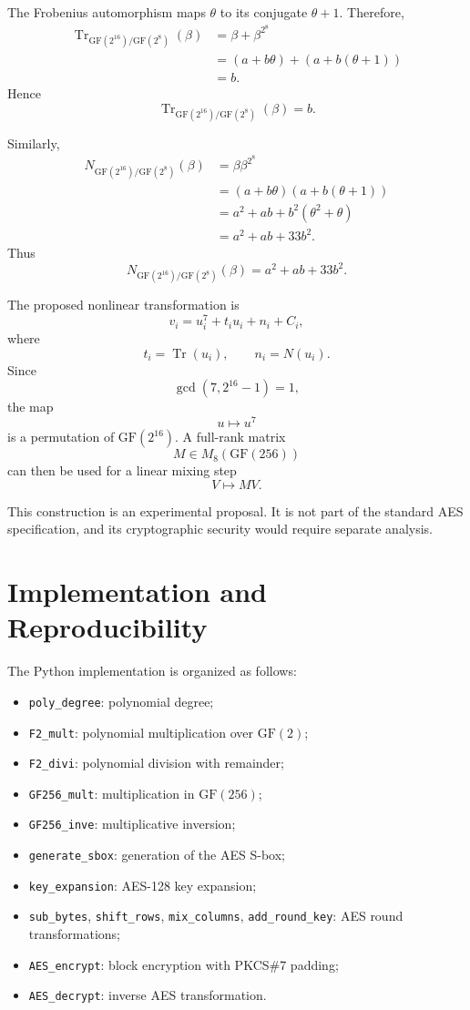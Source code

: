 \documentclass[11pt,a4paper]{article}
\begin{document}
The Frobenius automorphism maps $\theta$ to its conjugate $\theta+1$.
Therefore,
\[
\begin{aligned}
\operatorname{Tr}_{\mathrm{GF}(2^{16})/\mathrm{GF}(2^8)}(\beta)
&=\beta+\beta^{2^8}\\
&=(a+b\theta)+(a+b(\theta+1))\\
&=b.
\end{aligned}
\]
Hence
\[
\boxed{
\operatorname{Tr}_{\mathrm{GF}(2^{16})/\mathrm{GF}(2^8)}(\beta)=b.
}
\]

Similarly,
\[
\begin{aligned}
N_{\mathrm{GF}(2^{16})/\mathrm{GF}(2^8)}(\beta)
&=\beta\beta^{2^8}\\
&=(a+b\theta)(a+b(\theta+1))\\
&=a^2+ab+b^2(\theta^2+\theta)\\
&=a^2+ab+33b^2.
\end{aligned}
\]
Thus
\[
\boxed{
N_{\mathrm{GF}(2^{16})/\mathrm{GF}(2^8)}(\beta)
=a^2+ab+33b^2.
}
\]

The proposed nonlinear transformation is
\[
v_i=u_i^7+t_i u_i+n_i+C_i,
\]
where
\[
t_i=\operatorname{Tr}(u_i),\qquad
n_i=N(u_i).
\]
Since
\[
\gcd(7,2^{16}-1)=1,
\]
the map
\[
u\mapsto u^7
\]
is a permutation of $\mathrm{GF}(2^{16})$. A full-rank matrix
\[
M\in M_8(\mathrm{GF}(256))
\]
can then be used for a linear mixing step
\[
V\mapsto MV.
\]

This construction is an experimental proposal. It is not part of the
standard AES specification, and its cryptographic security would require
separate analysis.

\section{Implementation and Reproducibility}

The Python implementation is organized as follows:
\begin{itemize}
    \item \texttt{poly\_degree}: polynomial degree;
    \item \texttt{F2\_mult}: polynomial multiplication over $\mathrm{GF}(2)$;
    \item \texttt{F2\_divi}: polynomial division with remainder;
    \item \texttt{GF256\_mult}: multiplication in $\mathrm{GF}(256)$;
    \item \texttt{GF256\_inve}: multiplicative inversion;
    \item \texttt{generate\_sbox}: generation of the AES S-box;
    \item \texttt{key\_expansion}: AES-128 key expansion;
    \item \texttt{sub\_bytes}, \texttt{shift\_rows}, \texttt{mix\_columns},
          \texttt{add\_round\_key}: AES round transformations;
    \item \texttt{AES\_encrypt}: block encryption with PKCS\#7 padding;
    \item \texttt{AES\_decrypt}: inverse AES transformation.
\end{itemize}
\end{document}
